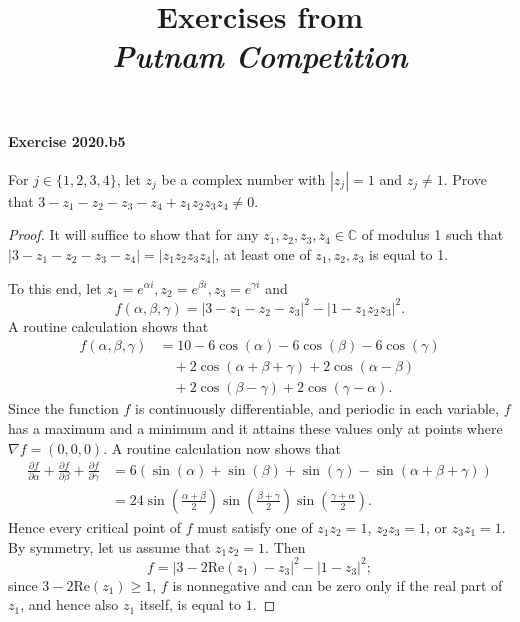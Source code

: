 \documentclass{article}
\title{\textbf{
Exercises from \\
\textit{Putnam Competition} \\
}}
\date{}
\begin{document}
\maketitle


\paragraph{Exercise 2020.b5} For $j \in\{1,2,3,4\}$, let $z_{j}$ be a complex number with $\left|z_{j}\right|=1$ and $z_{j} \neq 1$. Prove that $3-z_{1}-z_{2}-z_{3}-z_{4}+z_{1} z_{2} z_{3} z_{4} \neq 0 .$
\begin{proof}
    It will suffice to show that for any $z_1, z_2, z_3, z_4 \in \mathbb{C}$ of modulus 1 such that $|3-z_1-z_2-z_3-z_4| = |z_1z_2z_3z_4|$, at least one of $z_1, z_2, z_3$ is equal to 1.

To this end, let $z_1=e^{\alpha i}, z_2=e^{\beta i}, z_3=e^{\gamma i}$ and 
\[
f(\alpha, \beta, \gamma)=|3-z_1-z_2-z_3|^2-|1-z_1z_2z_3|^2.
\]
 A routine calculation shows that 
\begin{align*}
f(\alpha, \beta, \gamma)&=
10 - 6\cos(\alpha) - 6\cos(\beta) - 6\cos(\gamma) \\
&\quad + 2\cos(\alpha + \beta + \gamma) + 2\cos(\alpha - \beta) \\
&\quad + 2\cos(\beta - \gamma) + 2\cos(\gamma - \alpha).
\end{align*}
Since the function $f$ is continuously differentiable, and periodic in each variable, $f$ has a maximum and a minimum and it attains these values only at points where $\nabla f=(0,0,0)$.  A routine calculation now shows that 
\begin{align*}
\frac{\partial f}{\partial \alpha} + \frac{\partial f}{\partial \beta} + \frac{\partial f}{\partial \gamma} &=
6(\sin(\alpha) +\sin(\beta)+\sin(\gamma)-  \sin(\alpha + \beta + \gamma)) \\
&=
24\sin\left(\frac{\alpha+\beta}{2}\right) \sin\left(\frac{\beta+\gamma}{2}\right)
\sin\left(\frac{\gamma+\alpha}{2}\right).
\end{align*}
Hence every critical point of $f$ must satisfy one of $z_1z_2=1$, $z_2z_3=1$, or $z_3z_1=1$. By symmetry, let us assume that $z_1z_2=1$. Then 
\[
f = |3-2\mathrm{Re}(z_1)-z_3|^2-|1-z_3|^2;
\]
since $3-2\mathrm{Re}(z_1)\ge 1$, $f$ is nonnegative and can be zero only if the real part of $z_1$, and hence also $z_1$ itself, is equal to $1$. 
\end{proof}
\end{document}
